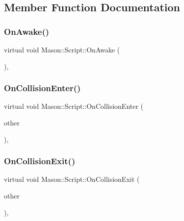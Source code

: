 \subsection{Member Function Documentation}
\hypertarget{class_mason_1_1_script_a962ebc543d860213b90e0963edaaff5c}{}\label{class_mason_1_1_script_a962ebc543d860213b90e0963edaaff5c} 
\subsubsection{\texorpdfstring{On\+Awake()}{OnAwake()}}
{\footnotesize\ttfamily virtual void Mason\+::\+Script\+::\+On\+Awake (\begin{DoxyParamCaption}{ }\end{DoxyParamCaption})\hspace{0.3cm}{\ttfamily [inline]}, {\ttfamily [virtual]}}

\hypertarget{class_mason_1_1_script_a1088013d6edc47d74643aa48a7cbbbdf}{}\label{class_mason_1_1_script_a1088013d6edc47d74643aa48a7cbbbdf} 
\subsubsection{\texorpdfstring{On\+Collision\+Enter()}{OnCollisionEnter()}}
{\footnotesize\ttfamily virtual void Mason\+::\+Script\+::\+On\+Collision\+Enter (\begin{DoxyParamCaption}\item[{\hyperlink{class_mason_1_1_game_object}{Game\+Object} $\ast$}]{other }\end{DoxyParamCaption})\hspace{0.3cm}{\ttfamily [inline]}, {\ttfamily [virtual]}}

\hypertarget{class_mason_1_1_script_a04d09648b7dba1bcb0a0ad3c3570e2f3}{}\label{class_mason_1_1_script_a04d09648b7dba1bcb0a0ad3c3570e2f3} 
\subsubsection{\texorpdfstring{On\+Collision\+Exit()}{OnCollisionExit()}}
{\footnotesize\ttfamily virtual void Mason\+::\+Script\+::\+On\+Collision\+Exit (\begin{DoxyParamCaption}\item[{\hyperlink{class_mason_1_1_game_object}{Game\+Object} $\ast$}]{other }\end{DoxyParamCaption})\hspace{0.3cm}{\ttfamily [inline]}, {\ttfamily [virtual]}}

